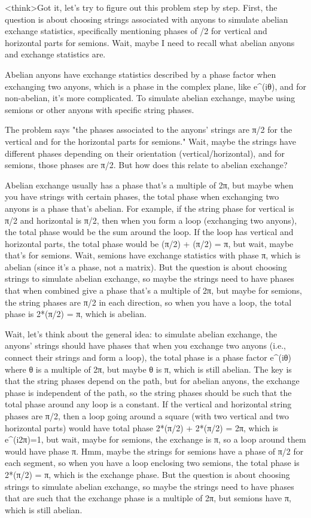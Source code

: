 <think>Got it, let's try to figure out this problem step by step. First, the question is about choosing strings associated with anyons to simulate abelian exchange statistics, specifically mentioning phases of /2 for vertical and horizontal parts for semions. Wait, maybe I need to recall what abelian anyons and exchange statistics are. 

Abelian anyons have exchange statistics described by a phase factor when exchanging two anyons, which is a phase in the complex plane, like e^(iθ), and for non-abelian, it's more complicated. To simulate abelian exchange, maybe using semions or other anyons with specific string phases. 

The problem says "the phases associated to the anyons' strings are π/2 for the vertical and for the horizontal parts for semions." Wait, maybe the strings have different phases depending on their orientation (vertical/horizontal), and for semions, those phases are π/2. But how does this relate to abelian exchange? 

Abelian exchange usually has a phase that's a multiple of 2π, but maybe when you have strings with certain phases, the total phase when exchanging two anyons is a phase that's abelian. For example, if the string phase for vertical is π/2 and horizontal is π/2, then when you form a loop (exchanging two anyons), the total phase would be the sum around the loop. If the loop has vertical and horizontal parts, the total phase would be (π/2) + (π/2) = π, but wait, maybe that's for semions. Wait, semions have exchange statistics with phase π, which is abelian (since it's a phase, not a matrix). But the question is about choosing strings to simulate abelian exchange, so maybe the strings need to have phases that when combined give a phase that's a multiple of 2π, but maybe for semions, the string phases are π/2 in each direction, so when you have a loop, the total phase is 2*(π/2) = π, which is abelian. 

Wait, let's think about the general idea: to simulate abelian exchange, the anyons' strings should have phases that when you exchange two anyons (i.e., connect their strings and form a loop), the total phase is a phase factor e^(iθ) where θ is a multiple of 2π, but maybe θ is π, which is still abelian. The key is that the string phases depend on the path, but for abelian anyons, the exchange phase is independent of the path, so the string phases should be such that the total phase around any loop is a constant. If the vertical and horizontal string phases are π/2, then a loop going around a square (with two vertical and two horizontal parts) would have total phase 2*(π/2) + 2*(π/2) = 2π, which is e^(i2π)=1, but wait, maybe for semions, the exchange is π, so a loop around them would have phase π. Hmm, maybe the strings for semions have a phase of π/2 for each segment, so when you have a loop enclosing two semions, the total phase is 2*(π/2) = π, which is the exchange phase. But the question is about choosing strings to simulate abelian exchange, so maybe the strings need to have phases that are such that the exchange phase is a multiple of 2π, but semions have π, which is still abelian. 

